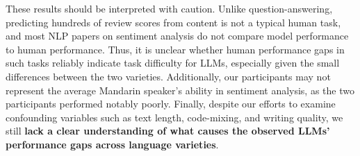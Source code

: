 These results should be interpreted with caution.
Unlike question-answering, predicting hundreds of review scores from content is not a typical human task, and most NLP papers on sentiment analysis do not compare model performance to human performance.
Thus, it is unclear whether human performance gaps in such tasks reliably indicate task difficulty for LLMs, especially given the small differences between the two varieties.
Additionally, our participants may not represent the average Mandarin speaker's ability in sentiment analysis, as the two participants performed notably poorly. 
Finally, despite our efforts to examine confounding variables such as text length, code-mixing, and writing quality, we still \textbf{lack a clear understanding of what causes the observed LLMs' performance gaps across language varieties}.




























